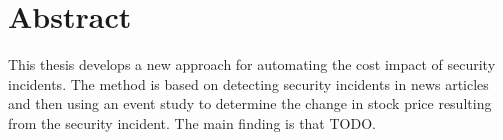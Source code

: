 \chapter*{Abstract}

This thesis develops a new approach for automating the cost impact of security incidents. The method is based on detecting security incidents in news articles and then using an event study to determine the change in stock price resulting from the security incident. The main finding is that TODO.
